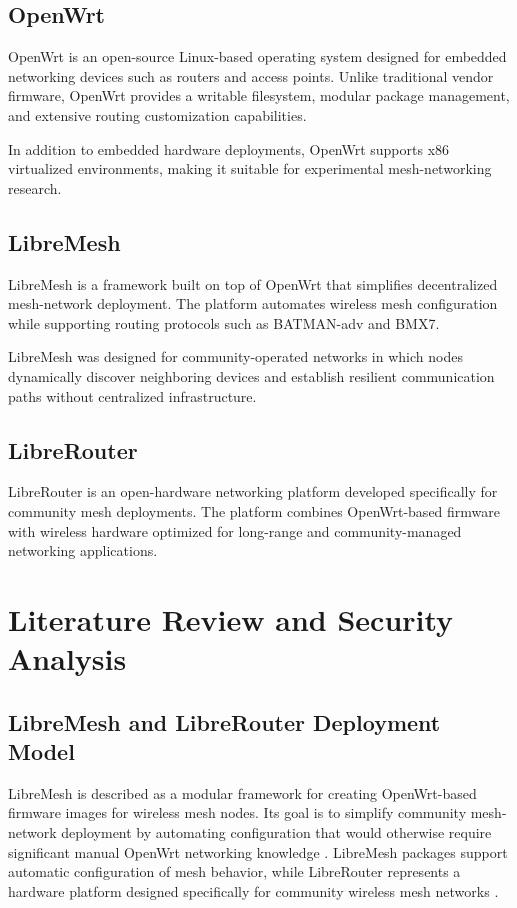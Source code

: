 \documentclass[conference]{IEEEtran}
\begin{document}
\subsection{OpenWrt}

OpenWrt is an open-source Linux-based operating system designed for embedded networking devices such as routers and access points. Unlike traditional vendor firmware, OpenWrt provides a writable filesystem, modular package management, and extensive routing customization capabilities.

In addition to embedded hardware deployments, OpenWrt supports x86 virtualized environments, making it suitable for experimental mesh-networking research.

\subsection{LibreMesh}

LibreMesh is a framework built on top of OpenWrt that simplifies decentralized mesh-network deployment. The platform automates wireless mesh configuration while supporting routing protocols such as BATMAN-adv and BMX7.

LibreMesh was designed for community-operated networks in which nodes dynamically discover neighboring devices and establish resilient communication paths without centralized infrastructure.

\subsection{LibreRouter}

LibreRouter is an open-hardware networking platform developed specifically for community mesh deployments. The platform combines OpenWrt-based firmware with wireless hardware optimized for long-range and community-managed networking applications.

\section{Literature Review and Security Analysis}

\subsection{LibreMesh and LibreRouter Deployment Model}

LibreMesh is described as a modular framework for creating OpenWrt-based firmware images for wireless mesh nodes. Its goal is to simplify community mesh-network deployment by automating configuration that would otherwise require significant manual OpenWrt networking knowledge \cite{libremeshdocs}. LibreMesh packages support automatic configuration of mesh behavior, while LibreRouter represents a hardware platform designed specifically for community wireless mesh networks \cite{limerouteredt}.
\end{document}
